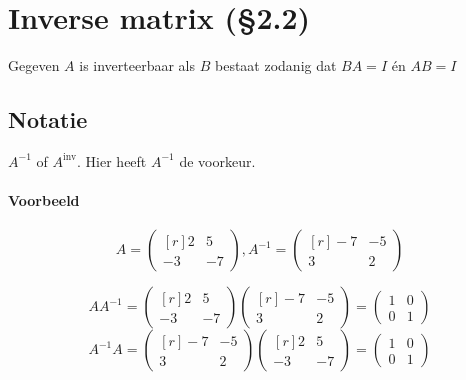 \section{Inverse matrix (\S2.2)}
Gegeven $A$ is inverteerbaar als $B$ bestaat zodanig dat $BA = I$ \'en $AB=I$
\subsection{Notatie}
$A^{-1}$ of $A^{\mbox{inv}}$. Hier heeft $A^{-1}$ de voorkeur.

\paragraph{Voorbeeld}
\[ A = \begin{pmatrix*}[r] 2 & 5 \\ -3 & -7 \end{pmatrix*}, A^{-1} = \begin{pmatrix*}[r] -7 & -5 \\ 3 & 2 \end{pmatrix*} \]

\[AA^{-1} = \begin{pmatrix*}[r] 2 & 5 \\ -3 & -7 \end{pmatrix*} \begin{pmatrix*}[r] -7 & -5 \\ 3 & 2 \end{pmatrix*} = \begin{pmatrix} 1 & 0 \\ 0 & 1 \end{pmatrix} \]
\[A^{-1}A = \begin{pmatrix*}[r] -7 & -5 \\ 3 & 2 \end{pmatrix*} \begin{pmatrix*}[r] 2 & 5 \\ -3 & -7 \end{pmatrix*} = \begin{pmatrix} 1 & 0 \\ 0 & 1 \end{pmatrix} \]


